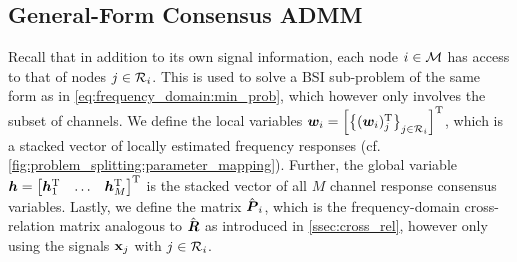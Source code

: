 \documentclass{article}
\begin{document}
\subsection{General-Form Consensus ADMM}
\label{ssec:general_consensus_admm}
Recall that in addition to its own signal information, each node \(i \in \mathcal{M}\) has access to that of nodes \(j \in \mathcal{R}_i\).
This is used to solve a BSI sub-problem of the same form as in \eqref{eq:frequency_domain:min_prob}, which however only involves the subset of channels.
We define the local variables \({\bm{w}}_i = \left[ \left\{ ({\bm{w}}_i)_j^{\mathrm{T}} \right\}_{j \in \mathcal{R}_i} \right]^{\mathrm{T}}\), which is a stacked vector of locally estimated frequency responses (cf. \autoref{fig:problem_splitting:parameter_mapping}).
Further, the global variable \({\bm{h}} = \begin{bmatrix}
    {\bm{h}}_1^{\mathrm{T}} & \ldots & {\bm{h}}_M^{\mathrm{T}}
\end{bmatrix}^{\mathrm{T}}\) is the stacked vector of all \(M\) channel response consensus variables.
Lastly, we define the matrix \(\hat{{\bm{{P}}}}_i\), which is the frequency-domain cross-relation matrix analogous to \(\hat{{\bm{{R}}}}\) as introduced in \autoref{ssec:cross_rel}, however only using the signals \(\bm{\mathrm{x}}_j\) with \(j \in \mathcal{R}_i\).
\end{document}

